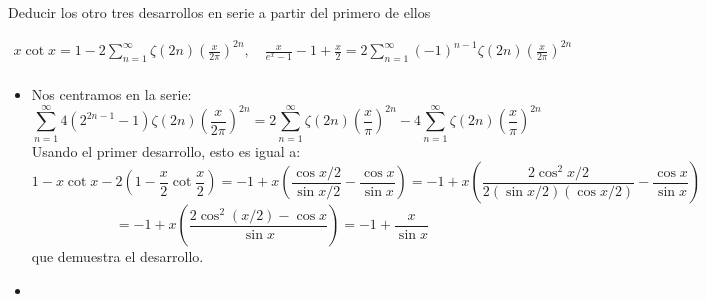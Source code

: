 \documentclass[twoside]{article}
\begin{document}
\begin{ejercicio}{5}
Deducir los otro tres desarrollos en serie a partir del primero de ellos

\begin{gather*}
	x \cot x = 1-2 \sum_{n=1}^{∞} ζ(2n) \left(\frac{x}{2π}\right)^{2n}, \quad \frac{x}{e^x-1}-1+\frac{x}{2}=2\sum_{n=1}^{∞}(-1)^{n-1}ζ(2n)\left(\frac{x}{2π}\right)^{2n}\\
\end{gather*}
\end{ejercicio}
\begin{solucion}\mbox{}
\begin{itemize}
	\item Nos centramos en la serie:
	\[ \sum_{n=1}^{∞} 4(2^{2n-1}-1)ζ(2n)\left(\frac{x}{2π}\right)^{2n} = 2 \sum_{n=1}^{∞} ζ(2n)\left(\frac{x}{π}\right)^{2n}-4\sum_{n=1}^{∞}ζ(2n)\left(\frac{x}{π}\right)^{2n} \]
	Usando el primer desarrollo, esto es igual a:
	\[ 1-x\cot x - 2\left(1-\frac{x}{2}\cot \frac{x}{2}\right) = -1+x\left(\frac{\cos x/2}{\sin x/2} - \frac{\cos x}{\sin x}\right)= -1+x\left(\frac{2\cos^2 x/2}{2(\sin x/2)(\cos x/2)} - \frac{\cos x}{\sin x}\right) \]
	\[ = -1 + x \left(\frac{2\cos^2(x/2) - \cos x}{\sin x}\right) = -1 + \frac{x}{\sin x}\]
	que demuestra el desarrollo.
	
	\item
\end{itemize}
\end{solucion}
\end{document}
